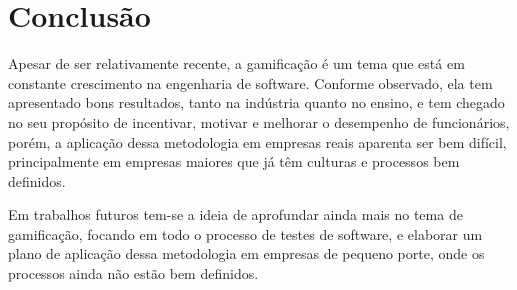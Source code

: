 \documentclass[twoside,english,brazilian]{UNISINOSartigo}
\begin{document}


\section{Conclusão}
Apesar de ser relativamente recente, a gamificação é um tema que está em constante crescimento na engenharia de software. Conforme observado, ela tem apresentado bons resultados, tanto na indústria quanto no ensino, e tem chegado no seu propósito de incentivar, motivar e melhorar o desempenho de funcionários, porém, a aplicação dessa metodologia em empresas reais aparenta ser bem difícil, principalmente em empresas maiores que já têm culturas e processos bem definidos. 

Em trabalhos futuros tem-se a ideia de aprofundar ainda mais no tema de gamificação, focando em todo o processo de testes de software, e elaborar um plano de aplicação dessa metodologia em empresas de pequeno porte, onde os processos ainda não estão bem definidos.

%
\begin{otherlanguage}{english}
\othertitle{}
\begin{abstract}

\palavraschave{}
\end{abstract}
\end{otherlanguage}




\end{document}
